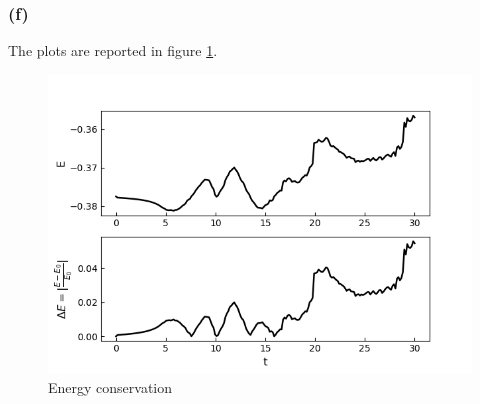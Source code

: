 \documentclass{article}
\begin{document}
\subsubsection*{(f)}
The plots are reported in figure \ref{fig:energy}.
\begin{figure}[h]
    \centering
    \includegraphics[scale=0.9]{energy.png}
    \caption{Energy conservation}
    \label{fig:energy}
\end{figure}
\end{document}
